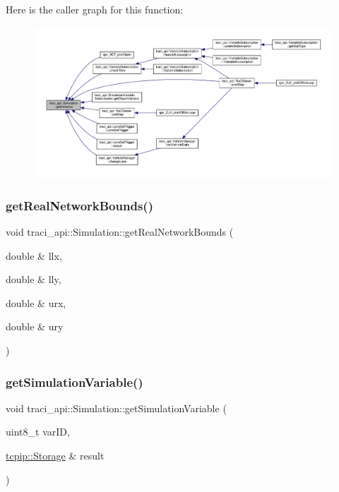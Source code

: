 Here is the caller graph for this function\+:\nopagebreak
\begin{figure}[H]
\begin{center}
\leavevmode
\includegraphics[width=350pt]{classtraci__api_1_1_simulation_a5bd3febd1571525c2dac2b68e37f694e_icgraph}
\end{center}
\end{figure}
\mbox{\label{classtraci__api_1_1_simulation_a1124e65809e0e3f6109654de9b28daf8}} 
\subsubsection{\texorpdfstring{get\+Real\+Network\+Bounds()}{getRealNetworkBounds()}}
{\footnotesize\ttfamily void traci\+\_\+api\+::\+Simulation\+::get\+Real\+Network\+Bounds (\begin{DoxyParamCaption}\item[{double \&}]{llx,  }\item[{double \&}]{lly,  }\item[{double \&}]{urx,  }\item[{double \&}]{ury }\end{DoxyParamCaption})}

\mbox{\label{classtraci__api_1_1_simulation_aa7ebe041dd0f34ccef7f2f2293775c3b}} 
\subsubsection{\texorpdfstring{get\+Simulation\+Variable()}{getSimulationVariable()}}
{\footnotesize\ttfamily void traci\+\_\+api\+::\+Simulation\+::get\+Simulation\+Variable (\begin{DoxyParamCaption}\item[{uint8\+\_\+t}]{var\+ID,  }\item[{\hyperlink{classtcpip_1_1_storage}{tcpip\+::\+Storage} \&}]{result }\end{DoxyParamCaption})}

